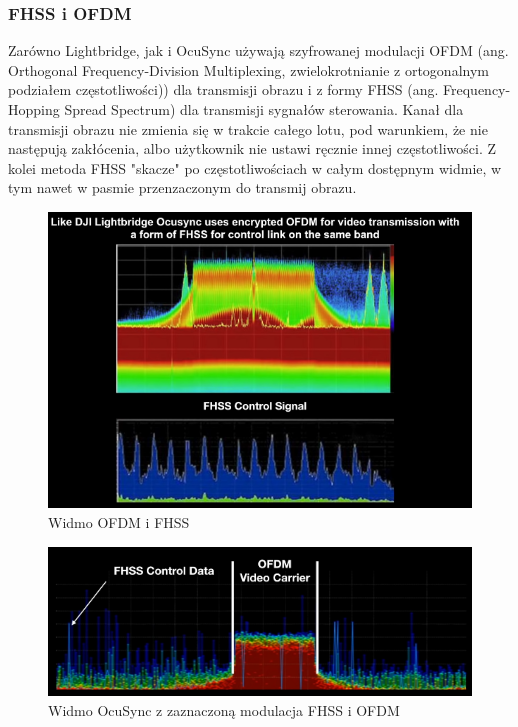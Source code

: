 \newpage
\subsubsection{FHSS i  OFDM}

\hspace{1cm}Zarówno Lightbridge, jak i OcuSync używają szyfrowanej modulacji OFDM (ang. Orthogonal Frequency-Division Multiplexing, zwielokrotnianie z ortogonalnym podziałem częstotliwości)) dla transmisji obrazu i z formy FHSS (ang. Frequency-Hopping Spread Spectrum) dla transmisji sygnałów sterowania. Kanał dla transmisji obrazu nie zmienia się w trakcie całego lotu, pod warunkiem, że nie następują zakłócenia, albo użytkownik nie ustawi ręcznie innej częstotliwości. Z kolei metoda FHSS "skacze" po częstotliwościach w całym dostępnym widmie, w tym nawet w pasmie przenzaczonym do transmij obrazu.\cite{FHSS-wiki} \cite{OFDM-wiki}

\begin{figure}[!htbp]
\centering
\includegraphics[width=14cm]{./Obrazy/ocusync_spectrum_1.png}
\caption{Widmo OFDM i FHSS}
\end{figure}

\begin{figure}[!htbp]
\centering
\includegraphics[width=14cm]{./Obrazy/ocusync_spectrum_2.png}
\caption{Widmo OcuSync z zaznaczoną modulacja FHSS i OFDM}
\end{figure}


